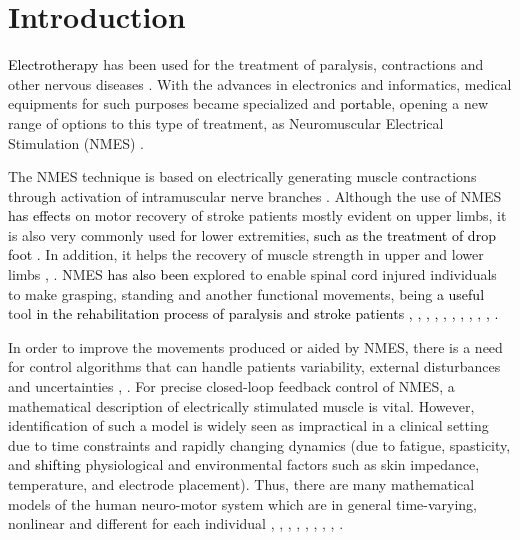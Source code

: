 \documentclass[review]{elsarticle}
\begin{document}
\linenumbers

\section{Introduction}

\textcolor{black}{Electrotherapy} has been used for the treatment of paralysis, contractions and other nervous diseases \cite{D:2008}. With the advances in electronics and informatics, medical equipments for such purposes  became specialized and \textcolor{black}{portable}, opening a new range of options to this type of treatment, as Neuromuscular Electrical Stimulation (NMES) \cite{M:2010}. 

The NMES technique is based on electrically  generating muscle contractions through activation of intramuscular nerve branches \cite{SC:2007}. 
Although the use of NMES \textcolor{black}{has effects} on motor recovery of stroke patients mostly evident on upper limbs, it is also very commonly used for lower extremities, \textcolor{black}{such as the treatment of drop foot \cite{Seel2016_CEP}.} 
In addition, it helps the recovery of muscle strength in upper and lower limbs \cite{R:2003}, \cite{VWPWHRK:2014}.
NMES  \textcolor{black}{has also been} explored to enable spinal cord injured individuals to make grasping, standing and another functional movements, being \textcolor{black}{a useful} tool \textcolor{black}{in the rehabilitation process of paralysis and stroke patients \cite{LP:2008}, \cite{S:82}, \cite{H:2008}, \cite{JWK:2004}, \cite{ZPWA:2011}, \cite{VHA:2012}, \cite{DTLZ:1999}, \cite{FHBC:2009}, \cite{PFSB:2005},
\cite{BPYSSP:2015}, \cite{BRD:2009}.}




In order to improve the movements produced or aided by NMES, there is a need for control algorithms that can handle patients 
variability, external disturbances and uncertainties \cite{BFF:2015}, \cite{H:2008}. 
For precise closed-loop feedback control of NMES, a mathematical description of electrically stimulated
muscle is vital. However, identification of such a model is widely seen as impractical in a clinical setting due to time
constraints and rapidly changing dynamics (due to fatigue, spasticity, and \textcolor{black}{shifting} physiological and environmental
factors such as skin impedance, temperature, and electrode placement). Thus, there are many mathematical models of the human neuro-motor system which are in general time-varying, nonlinear and different for each  individual \cite{NH:94}, \cite{DKFD:2016}, \cite{VHA:2012}, \cite{P:2002}, \cite{L:12}, \cite{SNPHFFR:2005}, \cite{LMFR:2010},
\cite{XCR:2014}, \cite{FHBC:2008}. 
\end{document}

